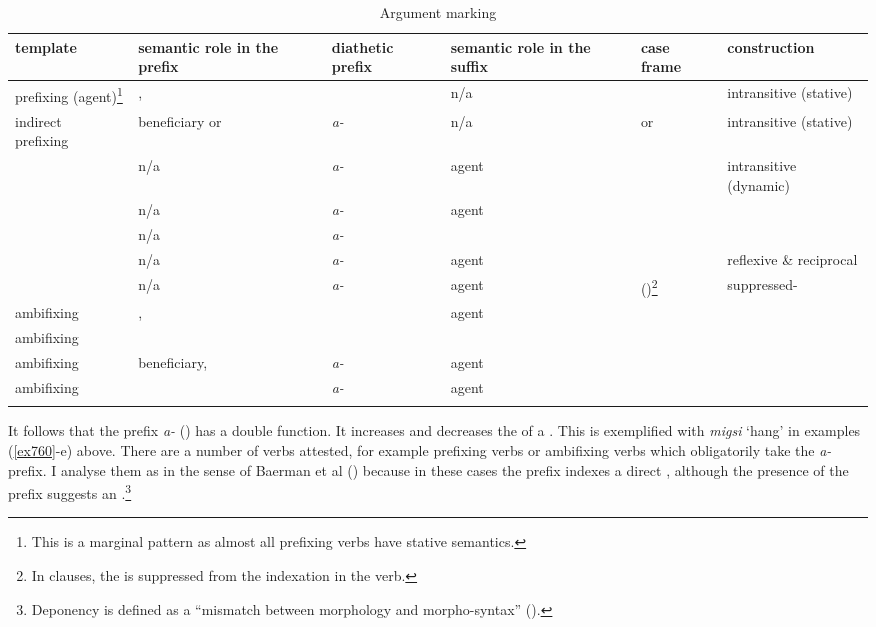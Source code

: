 {\renewcommand{\tabcolsep}{2pt}%
\begin{table}
\caption{Argument marking}
\label{argalignverbs} 
	\begin{tabularx}{\textwidth}{Q@{~~~}Qp{15mm}QlQ}
		\lsptoprule
		{template} &{semantic role} {in the prefix} &{diathetic} {prefix} &{semantic role} {in the suffix} &{case} {frame}& {construction}\\
		\midrule 
		prefixing (agent)\footnote{This is a marginal pattern as almost all prefixing verbs have stative semantics.} &, &\Zero{} &n/a &\Abs &intransitive (stative)\\ 
		\tablevspace
		\mbox{indirect } prefixing&beneficiary or  &\emph{a-}	&n/a &\Dat{} or \Poss &intransitive (stative)\\ 
		\tablevspace
		 &n/a &\emph{a-} &agent &\Abs	&intransitive (dynamic)\\ 
		\tablevspace
		 &n/a &\emph{a-} &agent &\Abs	&\\
		\tablevspace
		 &n/a &\emph{a-} & &\Abs &\\
		\tablevspace
		 &n/a &\emph{a-} &agent &\Abs	&reflexive \& reciprocal\\
		\tablevspace
		 &n/a &\emph{a-} &agent &\Erg{} (\Abs)\footnote{In  clauses, the  is suppressed from the indexation in the verb.}	& suppressed-\\ 
		\tablevspace
		 ambifixing &,  &\Zero &agent	&\Erg{} \Abs{} &\\
		\tablevspace
		 ambifixing & &\Zero &	&\Abs{} \Erg{} &\\
		\tablevspace
		 ambifixing &beneficiary,  &\emph{a-} &agent &\Erg{} \Abs{} \Dat &\\
		\tablevspace
		 ambifixing & &\emph{a-} &agent &\Erg{} \Abs{} \Poss &\\
		\lspbottomrule 
	\end{tabularx}
\end{table}}%

It follows that the  prefix \emph{a-} (\Vc) has a double function. It increases and decreases the  of a . This is exemplified with \emph{migsi} `hang' in examples (\ref{ex760}-e) above. There are a number of  verbs attested, for example prefixing verbs or  ambifixing verbs which obligatorily take the \emph{a-} prefix. I analyse them as  in the sense of Baerman et al (\citeyear{Baerman:2006depo}) because in these cases the  prefix indexes a direct , although the presence of the \Vc{} prefix suggests an .\footnote{Deponency is defined as a ``mismatch between morphology and morpho-syntax'' (\citealt{Baerman:2006depo}).}%

